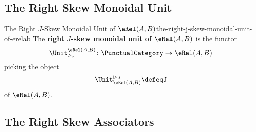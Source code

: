 \subsection{The Right Skew Monoidal Unit}\label{subsection-the-right-skew-monoidal-structure-on-rel-a-b-the-right-skew-monoidal-unit}
\begin{definition}{The Right $J$-Skew Monoidal Unit of $\eRel(A,B)$}{the-right-j-skew-monoidal-unit-of-erelab}%
    The \textbf{right $J$-skew monoidal unit of $\eRel(A,B)$} is the functor
    \[
        \Unit^{\eRel(A,B)}_{\rhd_{J}}
        \colon
        \PunctualCategory
        \to
        \eRel(A,B)
    \]
    picking the object
    \[
        \Unit^{\rhd_{J}}_{\eRel(A,B)}%
        \defeq%
        J
    \]%
    of $\eRel(A,B)$.
\end{definition}
\subsection{The Right Skew Associators}\label{subsection-the-right-skew-monoidal-structure-on-rel-a-b-the-right-skew-associators}
